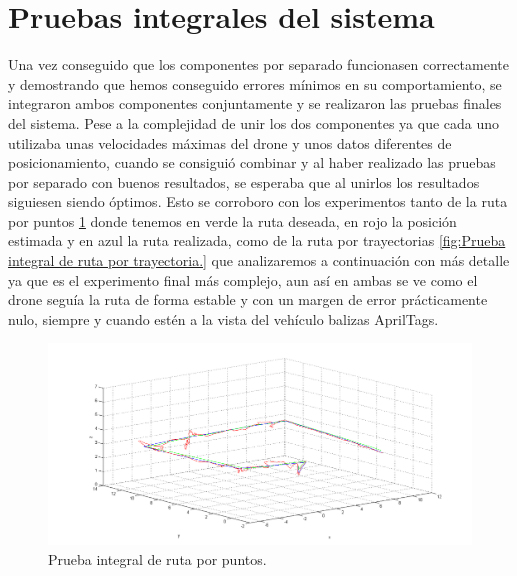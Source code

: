 \section{Pruebas integrales del sistema}
\hspace{1cm} Una vez conseguido que los componentes por separado funcionasen correctamente y demostrando que hemos conseguido errores mínimos en su comportamiento, se integraron ambos componentes conjuntamente y se realizaron las pruebas finales del sistema. Pese a la complejidad de unir los dos componentes ya que cada uno utilizaba unas velocidades máximas del drone y unos datos diferentes de posicionamiento, cuando se consiguió combinar y al haber realizado las pruebas por separado con buenos resultados, se esperaba que al unirlos los resultados siguiesen siendo óptimos. Esto se corroboro con los experimentos tanto de la ruta por puntos \ref{fig:Prueba integral de ruta por puntos.} donde tenemos en verde la ruta deseada, en rojo la posición estimada y en azul la ruta realizada, como de la ruta por trayectorias \ref{fig:Prueba integral de ruta por trayectoria.} que analizaremos a continuación con más detalle ya que es el experimento final más complejo, aun así en ambas se ve como el drone seguía la ruta de forma estable y con un margen de error prácticamente nulo, siempre y cuando estén a la vista del vehículo balizas AprilTags. 

\begin{figure}[H]
	\begin{center}
		\includegraphics[width=1\textwidth]{imag/IMG42.png}
				\caption{Prueba integral de ruta por puntos.}
		\label{fig:Prueba integral de ruta por puntos.}	
	\end{center}
\end{figure}

